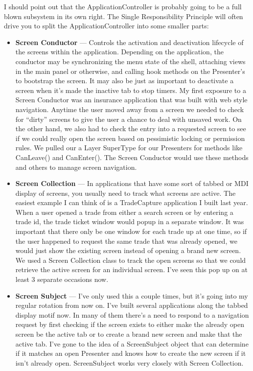 \documentclass{article}
\begin{document}
{I should point out that the ApplicationController is probably going to be a full blown subsystem in its own right.  The Single Responsibility Principle will often drive you to split the ApplicationController into some smaller parts:
 \begin{itemize}
     \item  \textbf{Screen Conductor} — Controls the activation and deactivation lifecycle of the screens within the application.  Depending on the application, the conductor may be synchronizing the menu state of the shell, attaching views in the main panel or otherwise, and calling hook methods on the Presenter's to bootstrap the screen.  It may also be just as important to deactivate a screen when it's made the inactive tab to stop timers.  My first exposure to a Screen Conductor was an insurance application that was built with web style navigation.  Anytime the user moved away from a screen we needed to check for “dirty” screens to give the user a chance to deal with unsaved work.  On the other hand, we also had to check the entry into a requested screen to see if we could really open the screen based on pessimistic locking or permission rules.  We pulled our a Layer SuperType for our Presenters for methods like CanLeave() and CanEnter().  The Screen Conductor would use these methods and others to manage screen navigation.  
 \item  \textbf{Screen Collection} — In applications that have some sort of tabbed or MDI display of screens, you usually need to track what screens are active.  The easiest example I can think of is a TradeCapture application I built last year.  When a user opened a trade from either a search screen or by entering a trade id, the trade ticket window would popup in a separate window.  It was important that there only be one window for each trade up at one time, so if the user happened to request the same trade that was already opened, we would just show the existing screen instead of opening a brand new screen.  We used a Screen Collection class to track the open screens so that we could retrieve the active screen for an individual screen.  I've seen this pop up on at least 3 separate occasions now.  
 \item  \textbf{Screen Subject} — I've only used this a couple times, but it's going into my regular rotation from now on.  I've built several applications along the tabbed display motif now.  In many of them there's a need to respond to a navigation request by first checking if the screen exists to either make the already open screen be the active tab or to create a brand new screen and make that the active tab.  I've gone to the idea of a ScreenSubject object that can determine if it matches an open Presenter and knows how to create the new screen if it isn't already open.  ScreenSubject works very closely with Screen Collection.  
 \end{itemize}
 
}
\end{document}
